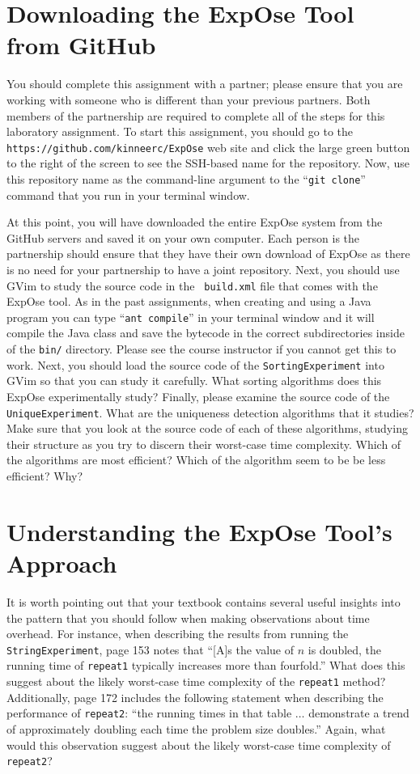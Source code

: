 \section*{Downloading the {\sc ExpOse} Tool from GitHub}

You should complete this assignment with a partner; please ensure that you are working with someone who is different
than your previous partners. Both members of the partnership are required to complete all of the steps for this
laboratory assignment. To start this assignment, you should go to the {\tt https://github.com/kinneerc/ExpOse} web site
and click the large green button to the right of the screen to see the SSH-based name for the repository. Now, use this
repository name as the command-line argument to the ``{\tt git clone}'' command that you run in your terminal window.

At this point, you will have downloaded the entire {\sc ExpOse} system from the GitHub servers and saved it on your own
computer. Each person is the partnership should ensure that they have their own download of {\sc ExpOse} as there is no
need for your partnership to have a joint repository. Next, you should use GVim to study the source code in the {\tt
build.xml} file that comes with the {\sc ExpOse} tool. As in the past assignments, when creating and using a Java
program you can type ``{\tt ant compile}'' in your terminal window and it will compile the Java class and save the
bytecode in the correct subdirectories inside of the {\tt bin/} directory. Please see the course instructor if you
cannot get this to work. Next, you should load the source code of the {\tt SortingExperiment} into GVim so that you can
study it carefully. What sorting algorithms does this {\sc ExpOse} experimentally study? Finally, please examine the
source code of the {\tt UniqueExperiment}. What are the uniqueness detection algorithms that it studies? Make sure that
you look at the source code of each of these algorithms, studying their structure as you try to discern their worst-case
time complexity. Which of the algorithms are most efficient? Which of the algorithm seem to be be less efficient? Why?

\section*{Understanding the {\sc ExpOse} Tool's Approach}

It is worth pointing out that your textbook contains several useful insights into the pattern that you should follow
when making observations about time overhead. For instance, when describing the results from running the {\tt
StringExperiment}, page 153 notes that ``[A]s the value of $n$ is doubled, the running time of {\tt repeat1} typically
increases more than fourfold.'' What does this suggest about the likely worst-case time complexity of the {\tt repeat1}
method? Additionally, page 172 includes the following statement when describing the performance of {\tt repeat2}: ``the
running times in that table $\ldots$ demonstrate a trend of approximately doubling each time the problem size doubles.''
Again, what would this observation suggest about the likely worst-case time complexity of {\tt repeat2}?

